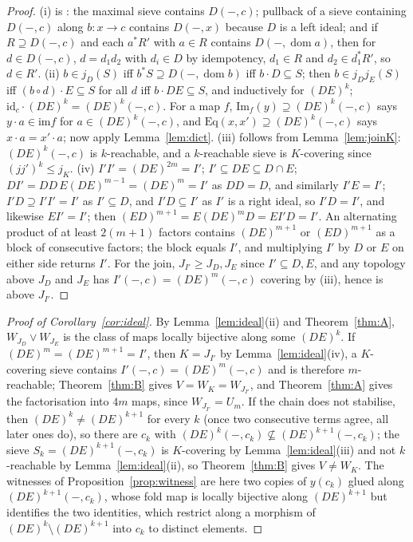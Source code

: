 \documentclass[11pt]{amsart}
\theoremstyle{definition}
\newcommand{\im}{\mathrm{im}}
\newcommand{\Ims}{\mathrm{Im}}
\newcommand{\Eq}{\mathrm{Eq}}
\begin{document}
\begin{proof}
(i) is \cite[Thm.~5.1]{Postnikov}: the maximal sieve contains $D(-,c)$;
pullback of a sieve containing $D(-,c)$ along $b\colon x\to c$ contains
$D(-,x)$ because $D$ is a left ideal; and if $R\supseteq D(-,c)$ and each
$a^*R'$ with $a\in R$ contains $D(-,\operatorname{dom}a)$, then for
$d\in D(-,c)$, $d=d_1d_2$ with $d_i\in D$ by idempotency, $d_1\in R$ and
$d_2\in d_1^*R'$, so $d\in R'$. (ii) $b\in j_D(S)$ iff $b^*S\supseteq
D(-,\operatorname{dom}b)$ iff $b\cdot D\subseteq S$; then $b\in j_Dj_E(S)$ iff
$(b\circ d)\cdot E\subseteq S$ for all $d$ iff $b\cdot DE\subseteq S$, and
inductively for $(DE)^k$; $\mathrm{id}_c\cdot(DE)^k=(DE)^k(-,c)$. For a map
$f$, $\Ims_f(y)\supseteq(DE)^k(-,c)$ says $y\cdot a\in\im f$ for $a\in(DE)^k
(-,c)$, and $\Eq(x,x')\supseteq(DE)^k(-,c)$ says $x\cdot a=x'\cdot a$; now
apply Lemma~\ref{lem:dict}. (iii)
follows from Lemma~\ref{lem:joinK}: $(DE)^k(-,c)$ is $k$-reachable, and a
$k$-reachable sieve is $K$-covering since $(jj')^k\le j_K$. (iv) $I'I'=(DE)^{2m}
=I'$; $I'\subseteq DE\subseteq D\cap E$; $DI'=DD\,E(DE)^{m-1}=(DE)^m=I'$ as
$DD=D$, and similarly $I'E=I'$; $I'D\supseteq I'I'=I'$ as $I'\subseteq D$, and
$I'D\subseteq I'$ as $I'$ is a right ideal, so $I'D=I'$, and likewise $EI'=I'$;
then $(ED)^{m+1}=E(DE)^mD=EI'D=I'$. An alternating product of at least
$2(m+1)$ factors contains $(DE)^{m+1}$ or $(ED)^{m+1}$ as a block of
consecutive factors; the block equals $I'$, and multiplying $I'$ by $D$ or $E$
on either side returns $I'$. For the join, $J_{I'}\ge J_D,J_E$ since
$I'\subseteq D,E$, and any topology above $J_D$ and $J_E$ has
$I'(-,c)=(DE)^m(-,c)$ covering by (iii), hence is above $J_{I'}$.
\end{proof}

\begin{proof}[Proof of Corollary~\ref{cor:ideal}]
By Lemma~\ref{lem:ideal}(ii) and Theorem~\ref{thm:A}, $W_{J_D}\vee W_{J_E}$
is the class of maps locally bijective along some $(DE)^k$. If
$(DE)^m=(DE)^{m+1}=I'$, then $K=J_{I'}$ by Lemma~\ref{lem:ideal}(iv), a
$K$-covering sieve contains $I'(-,c)=(DE)^m(-,c)$ and is therefore
$m$-reachable; Theorem~\ref{thm:B} gives $V=W_K=W_{J_{I'}}$, and
Theorem~\ref{thm:A} gives the factorisation into $4m$ maps, since
$W_{J_{I'}}=U_m$. If the chain does not stabilise, then $(DE)^k\ne(DE)^{k+1}$
for every $k$ (once two consecutive terms agree, all later ones do), so there
are $c_k$ with $(DE)^k(-,c_k)\not\subseteq(DE)^{k+1}(-,c_k)$; the sieve
$S_k=(DE)^{k+1}(-,c_k)$ is $K$-covering by Lemma~\ref{lem:ideal}(iii) and not
$k$-reachable by Lemma~\ref{lem:ideal}(ii), so Theorem~\ref{thm:B} gives
$V\ne W_K$. The witnesses of Proposition~\ref{prop:witness} are here two
copies of $y(c_k)$ glued along $(DE)^{k+1}(-,c_k)$, whose fold map is locally
bijective along $(DE)^{k+1}$ but identifies the two identities, which
restrict along a morphism of $(DE)^k\setminus(DE)^{k+1}$ into $c_k$ to
distinct elements.
\end{proof}
\end{document}
